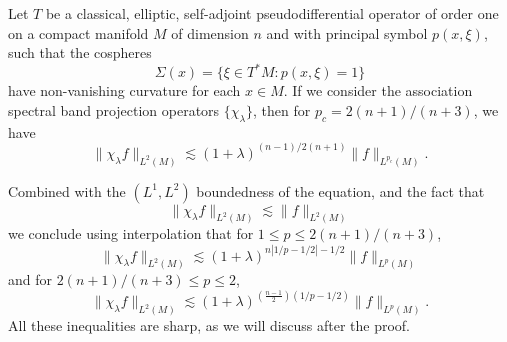 \begin{theorem}
    Let $T$ be a classical, elliptic, self-adjoint pseudodifferential operator of order one on a compact manifold $M$ of dimension $n$ and with principal symbol $p(x,\xi)$, such that the cospheres
    \[ \Sigma(x) = \{ \xi \in T^*M : p(x,\xi) = 1 \} \]
    have non-vanishing curvature for each $x \in M$. If we consider the association spectral band projection operators $\{ \chi_\lambda \}$, then for $p_c = 2(n+1)/(n+3)$, we have
    \[ \| \chi_\lambda f \|_{L^2(M)} \lesssim (1 + \lambda)^{(n - 1)/2(n+1)} \| f \|_{L^{p_c}(M)}. \]
\end{theorem}

\begin{remark}
    Combined with the $(L^1,L^2)$ boundedness of the equation, and the fact that
    \[ \| \chi_\lambda f \|_{L^2(M)} \lesssim \| f \|_{L^2(M)} \]
    we conclude using interpolation that for $1 \leq p \leq 2(n+1)/(n+3)$,
    \[ \| \chi_\lambda f \|_{L^2(M)} \lesssim (1 + \lambda)^{n|1/p - 1/2| - 1/2} \| f \|_{L^p(M)} \]
    and for $2(n+1)/(n+3) \leq p \leq 2$,
    \[ \| \chi_\lambda f \|_{L^2(M)} \lesssim (1 + \lambda)^{(\frac{n-1}{2})(1/p-1/2)} \| f \|_{L^p(M)}. \]
    All these inequalities are sharp, as we will discuss after the proof.
\end{remark}

